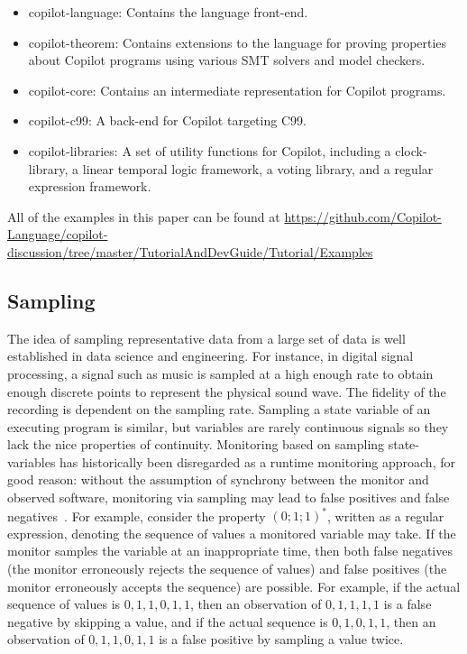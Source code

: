 \begin{itemize}
\item copilot-language: Contains the language front-end.
\item copilot-theorem: Contains extensions to the language for proving
properties about Copilot programs using various SMT solvers and model checkers.
\item copilot-core: Contains an intermediate representation for Copilot programs.
\item copilot-c99: A back-end for Copilot targeting C99.
\item copilot-libraries: A set of utility functions for Copilot, including a
clock-library, a linear temporal logic framework, a voting library, and a regular
expression framework.
\end{itemize}

All of the examples in this paper can be found at
\url{https://github.com/Copilot-Language/copilot-discussion/tree/master/TutorialAndDevGuide/Tutorial/Examples}

\subsection{Sampling} \label{sampling}
 The idea of sampling representative data from a large set of data  is well
established in data science and engineering.
%
 For instance, in digital signal processing, a signal such as music is sampled
at a high enough rate to obtain enough discrete points to represent the
physical sound wave.
%
 The fidelity of the recording is dependent on the sampling rate.
%
 Sampling a state variable of an executing program is similar, but variables
are rarely continuous signals so they lack the nice properties of continuity.
%
Monitoring based on sampling state-variables has historically been disregarded
as a runtime monitoring approach, for good reason: without the assumption of
synchrony between the monitor and observed software, monitoring via sampling
may lead to false positives and false negatives~\cite{DwyerDE08}.
%
 For example, consider the property $(0;1;1)^*$, written as a regular
expression, denoting the sequence of values a monitored variable may take.
%
 If the monitor samples the variable at an inappropriate time, then both false
negatives (the monitor erroneously rejects the sequence of values) and false
positives (the monitor erroneously accepts the sequence) are possible. 
%
 For example, if the actual sequence of values is $0,1,1,0,1,1$, then an
observation of $0,1,1,1,1$ is a false negative by skipping a value, and if the
actual sequence is $0,1,0,1,1$, then an observation of $0,1,1,0,1,1$ is a false
positive by sampling a value twice.
%


